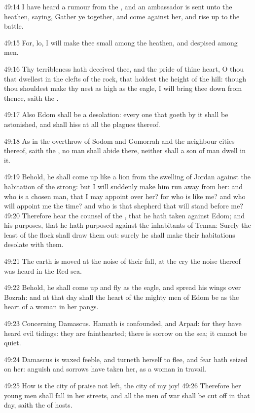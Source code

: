 49:14 I have heard a rumour from the \LORD, and an ambassador is sent
unto the heathen, saying, Gather ye together, and come against her,
and rise up to the battle.

49:15 For, lo, I will make thee small among the heathen, and despised
among men.

49:16 Thy terribleness hath deceived thee, and the pride of thine
heart, O thou that dwellest in the clefts of the rock, that holdest
the height of the hill: though thou shouldest make thy nest as high as
the eagle, I will bring thee down from thence, saith the \LORD.

49:17 Also Edom shall be a desolation: every one that goeth by it
shall be astonished, and shall hiss at all the plagues thereof.

49:18 As in the overthrow of Sodom and Gomorrah and the neighbour
cities thereof, saith the \LORD, no man shall abide there, neither
shall a son of man dwell in it.

49:19 Behold, he shall come up like a lion from the swelling of Jordan
against the habitation of the strong: but I will suddenly make him run
away from her: and who is a chosen man, that I may appoint over her?
for who is like me? and who will appoint me the time? and who is that
shepherd that will stand before me?  49:20 Therefore hear the counsel
of the \LORD, that he hath taken against Edom; and his purposes, that
he hath purposed against the inhabitants of Teman: Surely the least of
the flock shall draw them out: surely he shall make their habitations
desolate with them.

49:21 The earth is moved at the noise of their fall, at the cry the
noise thereof was heard in the Red sea.

49:22 Behold, he shall come up and fly as the eagle, and spread his
wings over Bozrah: and at that day shall the heart of the mighty men
of Edom be as the heart of a woman in her pangs.

49:23 Concerning Damascus. Hamath is confounded, and Arpad: for they
have heard evil tidings: they are fainthearted; there is sorrow on the
sea; it cannot be quiet.

49:24 Damascus is waxed feeble, and turneth herself to flee, and fear
hath seized on her: anguish and sorrows have taken her, as a woman in
travail.

49:25 How is the city of praise not left, the city of my joy!  49:26
Therefore her young men shall fall in her streets, and all the men of
war shall be cut off in that day, saith the \LORD of hosts.

